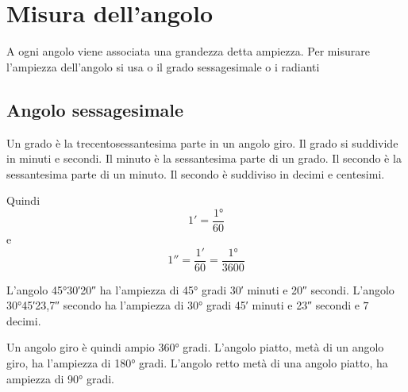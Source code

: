 \section{Misura dell'angolo}
\label{sec:MisuraAngoloGonio}

A ogni angolo viene associata una grandezza detta ampiezza.  Per misurare l'ampiezza dell'angolo si usa o il grado sessagesimale  o i radianti
\subsection{Angolo sessagesimale}
\begin{definizione}[Grado]
Un grado è la trecentosessantesima parte in un angolo giro. Il grado si suddivide in minuti e  secondi. Il minuto è la sessantesima parte di un grado. Il secondo è la sessantesima parte di un minuto. Il secondo è suddiviso in decimi e centesimi.
\end{definizione}
 Quindi \[\ang{;1;}=\dfrac{\ang{1}}{60}\] e  \[\ang{;;1}=\dfrac{\ang{;1;}}{60}=\dfrac{\ang{1}}{3600}\]
\begin{esempio}
L'angolo  \ang{45;30;20}  ha l'ampiezza di \ang{45} gradi \ang{;30;} minuti e \ang{;;20} secondi. L'angolo \ang{30;45;23,7} secondo ha l'ampiezza di \ang{30} gradi \ang{;45;} minuti e \ang{;;23} secondi e $7$ decimi.
\end{esempio}
Un angolo giro è quindi ampio \ang{360} gradi. L'angolo piatto,  metà di un angolo giro, ha l'ampiezza di \ang{180} gradi. L'angolo retto  metà di una angolo piatto, ha ampiezza di \ang{90} gradi.

